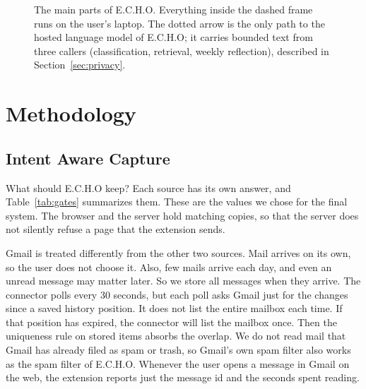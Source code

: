 \documentclass[conference]{IEEEtran}
\begin{document}
\begin{figure}[t]
\caption{The main parts of E.C.H.O. Everything inside the dashed frame runs on the user's laptop. The dotted arrow is the only path to the hosted language model of E.C.H.O; it carries bounded text from three callers (classification, retrieval, weekly reflection), described in Section~\ref{sec:privacy}.}
\label{fig:arch}
\end{figure}

\section{Methodology}\label{sec:method}
\subsection{Intent Aware Capture}
What should E.C.H.O keep? Each source has its own answer, and Table~\ref{tab:gates} summarizes them. These are the values we chose for the final system. The browser and the server hold matching copies, so that the server does not silently refuse a page that the extension sends.

Gmail is treated differently from the other two sources. Mail arrives on its own, so the user does not choose it. Also, few mails arrive each day, and even an unread message may matter later. So we store all messages when they arrive. The connector polls every 30 seconds, but each poll asks Gmail just for the changes since a saved history position. It does not list the entire mailbox each time. If that position has expired, the connector will list the mailbox once. Then the uniqueness rule on stored items absorbs the overlap. We do not read mail that Gmail has already filed as spam or trash, so Gmail's own spam filter also works as the spam filter of E.C.H.O. Whenever the user opens a message in Gmail on the web, the extension reports just the message id and the seconds spent reading.
\end{document}
